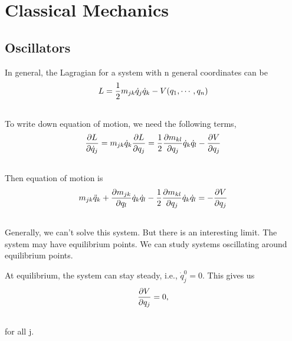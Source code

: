 \documentclass[letterpaper,10pt,english]{sphinxmanual}
\begin{document}
\section{Classical Mechanics}
\label{ClassicalMechanics:classical-mechanics}\label{ClassicalMechanics::doc}

\subsection{Oscillators}
\label{ClassicalMechanics:oscillators}
In general, the Lagragian for a system with n general coordinates can be
\begin{gather}
\begin{split}L = \frac{1}{2} m _ {jk} \dot q_j \dot q_k - V(q_1, \cdots, q_n)\end{split}\notag\\\begin{split}\end{split}\notag
\end{gather}
To write down equation of motion, we need the following terms,
\begin{gather}
\begin{split}\frac{\partial L}{\partial \dot q_j} = m_{jk} \dot q_k
\frac{\partial L}{\partial q_j} = \frac{1}{2} \frac{\partial m_{kl}}{\partial q_j} \dot q_k \dot q_l - \frac{\partial V}{\partial q_j}\end{split}\notag\\\begin{split}\end{split}\notag
\end{gather}
Then equation of motion is
\begin{gather}
\begin{split}m_{jk} \ddot q_{k} + \frac{\partial m_{jk}}{\partial q_l} \dot q_k \dot q_l - \frac{1}{2} \frac{\partial m_{kl}}{\partial q_j} \dot q_k \dot q_l = - \frac{\partial V}{\partial q_j}\end{split}\notag\\\begin{split}\end{split}\notag
\end{gather}
Generally, we can't solve this system. But there is an interesting limit. The system may have equilibrium points. We can study systems oscillating around equilibrium points.

At equilibrium, the system can stay steady, i.e., $\dot q_j^0 = 0$. This gives us
\begin{gather}
\begin{split}\frac{\partial V}{\partial q_j} = 0 ,\end{split}\notag\\\begin{split}\end{split}\notag
\end{gather}
for all j.
\end{document}

